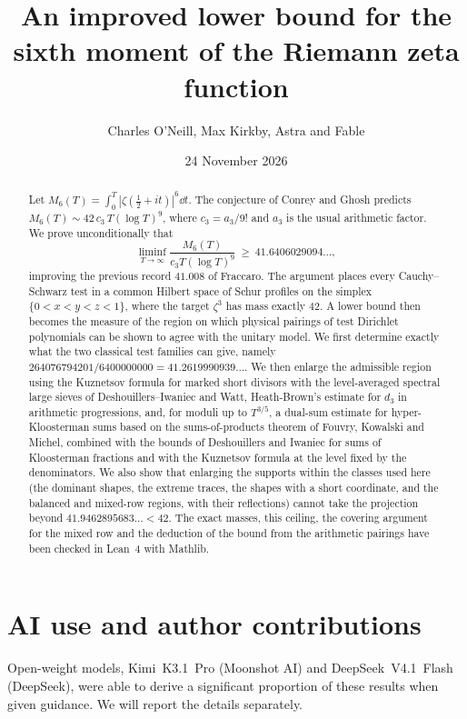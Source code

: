 \documentclass[11pt,colorlinks]{charlie}
\title{An improved lower bound for the sixth moment of the Riemann zeta function}
\author{Charles O'Neill, Max Kirkby, Astra and Fable}
\date{24 November 2026}
\begin{document}
\maketitle

\begin{abstract}
Let $M_6(T)=\int_0^T|\zeta(\tfrac12+it)|^6\dd t$. The conjecture of Conrey and Ghosh predicts $M_6(T)\sim 42\,c_3\,T(\log T)^9$, where $c_3=a_3/9!$ and $a_3$ is the usual arithmetic factor. We prove unconditionally that
\[
 \liminf_{T\to\infty}\frac{M_6(T)}{c_3T(\log T)^9}\ \ge\ 41.6406029094\ldots,
\]
improving the previous record $41.008$ of Fraccaro. The argument places every Cauchy--Schwarz test in a common Hilbert space of Schur profiles on the simplex $\{0<x<y<z<1\}$, where the target $\zeta^3$ has mass exactly $42$. A lower bound then becomes the measure of the region on which physical pairings of test Dirichlet polynomials can be shown to agree with the unitary model. We first determine exactly what the two classical test families can give, namely $264076794201/6400000000=41.2619990939\ldots$. We then enlarge the admissible region using the Kuznetsov formula for marked short divisors with the level-averaged spectral large sieves of Deshouillers--Iwaniec and Watt, Heath-Brown's estimate for $d_3$ in arithmetic progressions, and, for moduli up to $T^{3/5}$, a dual-sum estimate for hyper-Kloosterman sums based on the sums-of-products theorem of Fouvry, Kowalski and Michel, combined with the bounds of Deshouillers and Iwaniec for sums of Kloosterman fractions and with the Kuznetsov formula at the level fixed by the denominators. We also show that enlarging the supports within the classes used here (the dominant shapes, the extreme traces, the shapes with a short coordinate, and the balanced and mixed-row regions, with their reflections) cannot take the projection beyond $41.9462895683\ldots<42$. The exact masses, this ceiling, the covering argument for the mixed row and the deduction of the bound from the arithmetic pairings have been checked in Lean~4 with Mathlib.
\end{abstract}

\section*{AI use and author contributions}
\aiusestatement

Open-weight models, Kimi~K3.1~Pro (Moonshot AI) and DeepSeek~V4.1~Flash (DeepSeek), were able to derive a significant proportion of these results when given guidance. We will report the details separately.
\end{document}
